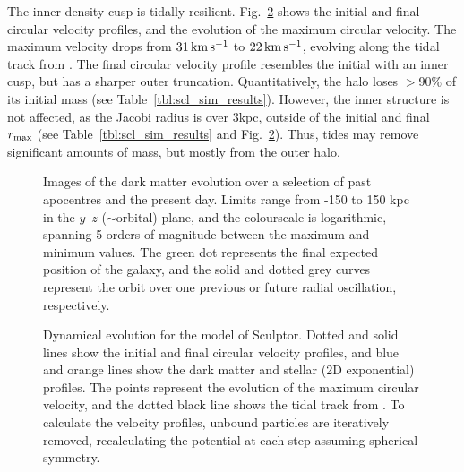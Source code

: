 The inner density cusp is tidally resilient.
Fig.~\ref{fig:scl_tidal_track} shows the initial and final circular
velocity profiles, and the evolution of the maximum circular velocity.
The maximum velocity drops from \(31\,{\rm km\,s^{-1}}\) to \(22\,{\rm km\,s^{-1}}\), evolving
along the tidal track from \citet{EN2021}. The final circular velocity
profile resembles the initial with an inner cusp, but has a sharper
outer truncation. Quantitatively, the halo loses \(>90\%\) of its
initial mass (see Table~\ref{tbl:scl_sim_results}). However, the inner
structure is not affected, as the Jacobi radius is over 3kpc, outside of
the initial and final \(r_{\rm max}\) (see Table~\ref{tbl:scl_sim_results} and
Fig.~\ref{fig:scl_tidal_track}). Thus, tides may remove significant
amounts of mass, but mostly from the outer halo.

\begin{figure}
\centering
{}
\caption[Sculptor simulation snapshots]{Images of the dark matter
evolution over a selection of past apocentres and the present day.
Limits range from -150 to 150 kpc in the \(y\)--\(z\) (\(\sim\)orbital)
plane, and the colourscale is logarithmic, spanning 5 orders of
magnitude between the maximum and minimum values. The green dot
represents the final expected position of the galaxy, and the solid and
dotted grey curves represent the orbit over one previous or future
radial oscillation, respectively.}\label{fig:scl_sim_images}
\end{figure}

\begin{figure}
\centering
{}
\caption[Sculptor tidal tracks]{Dynamical evolution for the \smallperi{}
model of Sculptor. Dotted and solid lines show the initial and final
circular velocity profiles, and blue and orange lines show the dark
matter and stellar (2D exponential) profiles. The points represent the
evolution of the maximum circular velocity, and the dotted black line
shows the tidal track from \citet{EN2021}. To calculate the velocity
profiles, unbound particles are iteratively removed, recalculating the
potential at each step assuming spherical
symmetry.}\label{fig:scl_tidal_track}
\end{figure}

